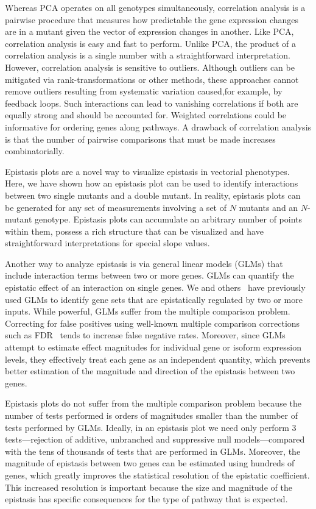 \documentclass[10pt, onecolumn]{article}
\begin{document}
Whereas PCA operates on all genotypes simultaneously, correlation analysis is a
pairwise procedure that measures how predictable the gene expression changes are
in a mutant given the vector of expression changes in another. Like PCA,
correlation analysis is easy and fast to perform. Unlike PCA, the product of a
correlation analysis is a single number with a straightforward interpretation.
However, correlation analysis is sensitive to outliers. Although outliers can be
mitigated via rank-transformations or other methods, these approaches cannot
remove outliers resulting from systematic variation caused,for example, by
feedback loops. Such interactions can lead to vanishing correlations if both are
equally strong and should be accounted for. Weighted correlations could be
informative for ordering genes along pathways. A drawback of correlation
analysis is that the number of pairwise comparisons that must be made increases
combinatorially.

Epistasis plots are a novel way to visualize epistasis in vectorial phenotypes.
Here, we have shown how an epistasis plot can be used to identify interactions
between two single mutants and a double mutant. In reality, epistasis plots
can be generated for any set of measurements involving a set of $N$ mutants and
an $N$-mutant genotype. Epistasis plots can accumulate an arbitrary number of
points within them, possess a rich structure that can be visualized and have
straightforward interpretations for special slope values.

Another way to analyze epistasis is via general linear models (GLMs) that include
interaction terms between two or more genes. GLMs can quantify the epistatic
effect of an interaction on single genes. We and others~\cite{Dixit2016,
Angeles-Albores2016a} have previously used GLMs to identify gene sets that are
epistatically regulated by two or more inputs. While powerful, GLMs suffer from
the multiple comparison problem. Correcting for false positives using well-known
multiple comparison corrections such as FDR~\cite{Storey2003} tends to increase
false negative rates.  Moreover, since GLMs attempt to estimate effect magnitudes
for individual gene or isoform expression levels, they effectively treat each gene
as an independent quantity, which prevents better estimation of the magnitude and
direction of the epistasis between two genes.

Epistasis plots do not suffer from the multiple comparison problem because the
number of tests performed is orders of magnitudes smaller than the number
of tests performed by GLMs. Ideally, in an epistasis plot we need only perform
3 tests---rejection of additive, unbranched and suppressive null models---compared
with the tens of thousands of tests that are performed in GLMs. Moreover, the
magnitude of epistasis between two genes can be estimated using hundreds of genes,
which greatly improves the statistical resolution of the epistatic coefficient.
This increased resolution is important because the size and magnitude of the
epistasis has specific consequences for the type of pathway that is expected.
\end{document}
